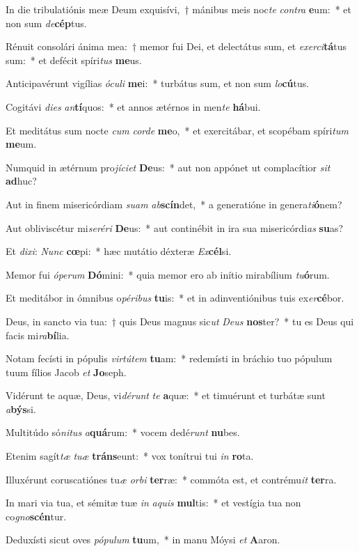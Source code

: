 \item In die tribulatiónis meæ Deum exquisívi,~† mánibus meis noc\textit{te} \textit{con}\textit{tra} \textbf{e}um:~* et non sum \textit{de}\textbf{cép}tus.
\item Rénuit consolári ánima mea:~† memor fui Dei, et delectátus sum, et \textit{ex}\textit{er}\textit{ci}\textbf{tá}tus sum:~* et defécit spíri\textit{tus} \textbf{me}us.
\item Anticipavérunt vigílias \textit{ó}\textit{cu}\textit{li} \textbf{me}i:~* turbátus sum, et non sum \textit{lo}\textbf{cú}tus.
\item Cogitávi \textit{di}\textit{es} \textit{an}\textbf{tí}quos:~* et annos ætérnos in men\textit{te} \textbf{há}bui.
\item Et meditátus sum nocte \textit{cum} \textit{cor}\textit{de} \textbf{me}o,~* et exercitábar, et scopébam spíri\textit{tum} \textbf{me}um.
\item Numquid in ætérnum pro\textit{jí}\textit{ci}\textit{et} \textbf{De}us:~* aut non appónet ut complacítior \textit{sit} \textbf{ad}huc?
\item Aut in finem misericórdiam \textit{su}\textit{am} \textit{ab}\textbf{scín}det,~* a generatióne in genera\textit{ti}\textbf{ó}nem?
\item Aut obliviscétur mi\textit{se}\textit{ré}\textit{ri} \textbf{De}us:~* aut continébit in ira sua misericórdi\textit{as} \textbf{su}as?
\item Et \textit{di}\textit{xi}: \textit{Nunc} \textbf{cœ}pi:~* hæc mutátio déxteræ \textit{Ex}\textbf{cél}si.
\item Memor fui \textit{ó}\textit{pe}\textit{rum} \textbf{Dó}mini:~* quia memor ero ab inítio mirabílium \textit{tu}\textbf{ó}rum.
\item Et meditábor in ómnibus o\textit{pé}\textit{ri}\textit{bus} \textbf{tu}is:~* et in adinventiónibus tuis ex\textit{er}\textbf{cé}bor.
\item Deus, in sancto via tua:~† quis Deus magnus sic\textit{ut} \textit{De}\textit{us} \textbf{nos}ter?~* tu es Deus qui facis mi\textit{ra}\textbf{bí}lia.
\item Notam fecísti in pópulis \textit{vir}\textit{tú}\textit{tem} \textbf{tu}am:~* redemísti in bráchio tuo pópulum tuum fílios Jacob \textit{et} \textbf{Jo}seph.
\item Vidérunt te aquæ, Deus, vi\textit{dé}\textit{runt} \textit{te} \textbf{a}quæ:~* et timuérunt et turbátæ sunt \textit{a}\textbf{býs}si.
\item Multitúdo só\textit{ni}\textit{tus} \textit{a}\textbf{quá}rum:~* vocem dedé\textit{runt} \textbf{nu}bes.
\item Etenim sagít\textit{tæ} \textit{tu}\textit{æ} \textbf{tráns}eunt:~* vox tonítrui tui \textit{in} \textbf{ro}ta.
\item Illuxérunt coruscatiónes tu\textit{æ} \textit{or}\textit{bi} \textbf{ter}ræ:~* commóta est, et contrému\textit{it} \textbf{ter}ra.
\item In mari via tua, et sémitæ tuæ \textit{in} \textit{a}\textit{quis} \textbf{mul}tis:~* et vestígia tua non co\textit{gno}\textbf{scén}tur.
\item Deduxísti sicut oves \textit{pó}\textit{pu}\textit{lum} \textbf{tu}um,~* in manu Móysi \textit{et} \textbf{A}aron.
